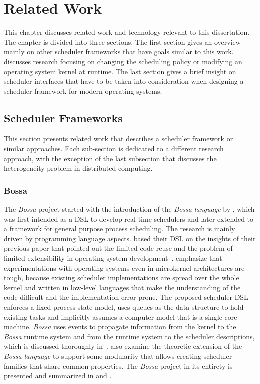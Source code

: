 \chapter{Related Work}%
\label{chap:related_work}

This chapter discusses related work and technology relevant to this dissertation. The chapter is divided into three sections. The first section gives an overview mainly on other scheduler frameworks that have goals similar to this work.  discusses research focusing on changing the scheduling policy or modifying an operating system kernel at runtime. The last section gives a brief insight on scheduler interfaces that have to be taken into consideration when designing a scheduler framework for modern operating systems.

\section{Scheduler Frameworks}

This section presents related work that describes a scheduler framework or similar approaches. Each sub-section is dedicated to a different research approach, with the exception of the last subsection that discusses the heterogeneity problem in distributed computing.

\subsection{Bossa}%
\label{sec:rw:bossa}

The \emph{Bossa} project started with the introduction of the \emph{Bossa language} by \textcite{Barreto-2002-Bossa}, which was first intended as a \ac{DSL} to develop real-time schedulers and later extended to a framework for general purpose process scheduling. The research is mainly driven by programming language aspects.  based their \ac{DSL} on the insights of their previous paper that pointed out the limited code reuse and the problem of limited extensibility in operating system development~\cite{Muller-2000-TowardsRobusOSes}.  emphasize that experimentations with operating systems even in microkernel architectures are tough, because existing scheduler implementations are spread over the whole kernel and written in low-level languages that make the understanding of the code difficult and the implementation error prone. The proposed scheduler \ac{DSL} enforces a fixed process state model, uses queues as the data structure to hold existing tasks and implicitly assumes a computer model that is a single core machine. \emph{Bossa} uses events to propagate information from the kernel to the \emph{Bossa} runtime system and from the runtime system to the scheduler descriptions, which is discussed thoroughly in~\cite{Lawall-2002-OSExpertise}. \Textcite{Lawall-2005-BossaNova} also examine the theoretic extension of the \emph{Bossa language} to support some modularity that allows creating scheduler families that share common properties. The \emph{Bossa} project in its entirety is presented and summarized in \cite{Lawall-2004-SchedulingHierarchies} and \cite{Muller-2005-BossaFW}.

